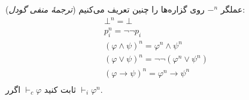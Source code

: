 (\emph{ترجمهٔ منفی گودل})
عملگر $\mathord{-}^n$ روی گزاره‌ها را چنین تعریف می‌کنیم:
\begin{gather*}
    \bot^n=\bot\\
    p_i^n=\neg\neg p_i\\
    (\varphi\wedge\psi)^n=\varphi^n\wedge\psi^n\\
    (\varphi\vee\psi)^n=\neg\neg(\varphi^n\vee\psi^n)\\
    (\varphi\to\psi)^n=\varphi^n\to\psi^n\\
\end{gather*}
ثابت کنید $\vdash_c\varphi$ اگرر $\vdash_i\varphi^n$.